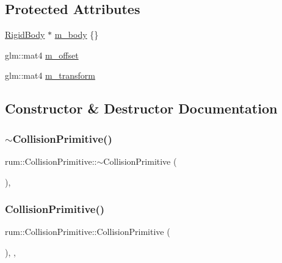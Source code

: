 \subsection*{Protected Attributes}
\begin{DoxyCompactItemize}
\item 
\mbox{\hyperlink{classrum_1_1_rigid_body}{Rigid\+Body}} $\ast$ \mbox{\hyperlink{classrum_1_1_collision_primitive_a9ef6e9862ac5e75330395368e401530e}{m\+\_\+body}} \{\}
\item 
glm\+::mat4 \mbox{\hyperlink{classrum_1_1_collision_primitive_a1617f197d7dbf54801bb21fbcedf730e}{m\+\_\+offset}}
\item 
glm\+::mat4 \mbox{\hyperlink{classrum_1_1_collision_primitive_a17dea68b6d2faa8573935fbaf4e81440}{m\+\_\+transform}}
\end{DoxyCompactItemize}


\subsection{Constructor \& Destructor Documentation}
\mbox{\label{classrum_1_1_collision_primitive_aaaa286303df8a1af561d698b4bb9f098}} 
\subsubsection{\texorpdfstring{$\sim$\+Collision\+Primitive()}{~CollisionPrimitive()}}
{\footnotesize\ttfamily rum\+::\+Collision\+Primitive\+::$\sim$\+Collision\+Primitive (\begin{DoxyParamCaption}{ }\end{DoxyParamCaption})\hspace{0.3cm}{\ttfamily [virtual]}, {\ttfamily [default]}}

\mbox{\label{classrum_1_1_collision_primitive_af314a601d4528bc79710e9e7d9d0413e}} 
\subsubsection{\texorpdfstring{Collision\+Primitive()}{CollisionPrimitive()}}
{\footnotesize\ttfamily rum\+::\+Collision\+Primitive\+::\+Collision\+Primitive (\begin{DoxyParamCaption}{ }\end{DoxyParamCaption})\hspace{0.3cm}{\ttfamily [explicit]}, {\ttfamily [protected]}, {\ttfamily [default]}}



